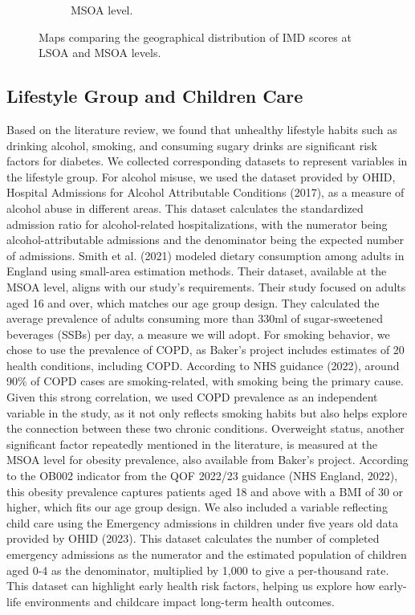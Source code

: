 \begin{figure}[ht]
\begin{subfigure}{.39\textwidth}
  \caption{MSOA level.}
  \label{fig:A3.22}
\end{subfigure}
\caption{Maps comparing the geographical distribution of IMD scores at LSOA and MSOA levels.}
\label{fig:A3.2}
\end{figure}


\subsection{Lifestyle Group and Children Care}
\label{sec:3.2.4}
Based on the literature review, we found that unhealthy lifestyle habits such as drinking alcohol, smoking, and consuming sugary drinks are significant risk factors for diabetes. We collected corresponding datasets to represent variables in the lifestyle group. For alcohol misuse, we used the dataset provided by OHID, Hospital Admissions for Alcohol Attributable Conditions (2017), as a measure of alcohol abuse in different areas. This dataset calculates the standardized admission ratio for alcohol-related hospitalizations, with the numerator being alcohol-attributable admissions and the denominator being the expected number of admissions.
Smith et al. (2021) modeled dietary consumption among adults in England using small-area estimation methods. Their dataset, available at the MSOA level, aligns with our study's requirements. Their study focused on adults aged 16 and over, which matches our age group design. They calculated the average prevalence of adults consuming more than 330ml of sugar-sweetened beverages (SSBs) per day, a measure we will adopt.
For smoking behavior, we chose to use the prevalence of COPD, as Baker's project includes estimates of 20 health conditions, including COPD. According to NHS guidance (2022), around 90\% of COPD cases are smoking-related, with smoking being the primary cause. Given this strong correlation, we used COPD prevalence as an independent variable in the study, as it not only reflects smoking habits but also helps explore the connection between these two chronic conditions. Overweight status, another significant factor repeatedly mentioned in the literature, is measured at the MSOA level for obesity prevalence, also available from Baker's project. According to the OB002 indicator from the QOF 2022/23 guidance (NHS England, 2022), this obesity prevalence captures patients aged 18 and above with a BMI of 30 or higher, which fits our age group design.
We also included a variable reflecting child care using the Emergency admissions in children under five years old data provided by OHID (2023). This dataset calculates the number of completed emergency admissions as the numerator and the estimated population of children aged 0-4 as the denominator, multiplied by 1,000 to give a per-thousand rate. This dataset can highlight early health risk factors, helping us explore how early-life environments and childcare impact long-term health outcomes.


